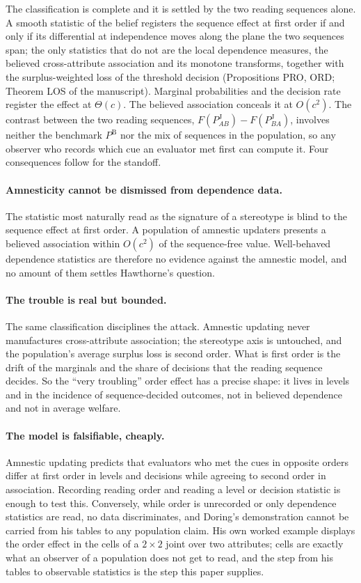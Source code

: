\documentclass[11pt,a4paper]{article}
\newcommand{\PB}{P^{\mathrm{B}}}
\newcommand{\PJ}{P^{\mathrm{J}}}
\newcommand{\bigO}{O}
\begin{document}
The classification is complete and it is settled by the two reading sequences
alone. A smooth statistic of the belief registers the sequence effect at first
order if and only if its differential at independence moves along the plane the
two sequences span; the only statistics that do not are the local dependence
measures, the believed cross-attribute association and its monotone transforms,
together with the surplus-weighted loss of the threshold decision (Propositions
PRO, ORD; Theorem LOS of the manuscript). Marginal probabilities and the
decision rate register the effect at $\Theta(c)$. The believed association
conceals it at $\bigO(c^2)$. The contrast between the two reading sequences,
$F(\PJ_{AB})-F(\PJ_{BA})$, involves neither the benchmark $\PB$ nor the mix of
sequences in the population, so any observer who records which cue an evaluator
met first can compute it. Four consequences follow for the standoff.

\paragraph{Amnesticity cannot be dismissed from dependence data.}
The statistic most naturally read as the signature of a stereotype is blind to
the sequence effect at first order. A population of amnestic updaters presents a
believed association within $\bigO(c^2)$ of the sequence-free value. Well-behaved
dependence statistics are therefore no evidence against the amnestic model, and
no amount of them settles Hawthorne's question.

\paragraph{The trouble is real but bounded.}
The same classification disciplines the attack. Amnestic updating never
manufactures cross-attribute association; the stereotype axis is untouched, and
the population's average surplus loss is second order. What is first order is
the drift of the marginals and the share of decisions that the reading sequence
decides. So the ``very troubling'' order effect has a precise shape: it lives in
levels and in the incidence of sequence-decided outcomes, not in believed
dependence and not in average welfare.

\paragraph{The model is falsifiable, cheaply.}
Amnestic updating predicts that evaluators who met the cues in opposite orders
differ at first order in levels and decisions while agreeing to second order in
association. Recording reading order and reading a level or decision statistic
is enough to test this. Conversely, while order is unrecorded or only dependence
statistics are read, no data discriminates, and Doring's demonstration cannot be
carried from his tables to any population claim. His own worked example displays
the order effect in the cells of a $2\times2$ joint over two attributes; cells
are exactly what an observer of a population does not get to read, and the step
from his tables to observable statistics is the step this paper supplies.
\end{document}
